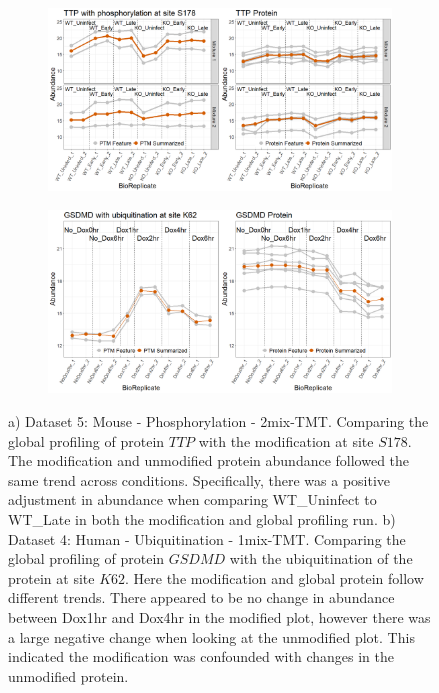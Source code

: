 \documentclass[mcp]{article}
\numberwithin{table}{section}
\begin{document}
\begin{figure}[h!]
\centering
\begin{subfigure}{\textwidth}
 \centering
\includegraphics[width=1.0\textwidth]{images/No_Difference_Shigella_Profile_Plot}
\caption{}
\label{fig:data4_profile_plot}
 \end{subfigure}
 \begin{subfigure}{\textwidth}
 \centering
	\includegraphics[width=1.0\textwidth]{images/IpaH_prof_plot.png}
	\caption{}
	\label{fig:data5_profile_plot}
	 \end{subfigure}
\caption{a) Dataset 5: Mouse - Phosphorylation - 2mix-TMT. Comparing the global profiling of protein $TTP$ with the modification at site $S178$. The modification and unmodified protein abundance followed the same trend across conditions. Specifically, there was a positive adjustment in abundance when comparing WT\_Uninfect to WT\_Late in both the modification and global profiling run. b) Dataset 4: Human - Ubiquitination - 1mix-TMT. Comparing the global profiling of protein $GSDMD$ with the ubiquitination of the protein at site $K62$. Here the modification and global protein follow different trends. There appeared to be no change in abundance between Dox1hr and Dox4hr in the modified plot, however there was a large negative change when looking at the unmodified plot. This indicated the modification was confounded with changes in the unmodified protein.}
\label{fig:profile_plots}
\end{figure}
\end{document}
